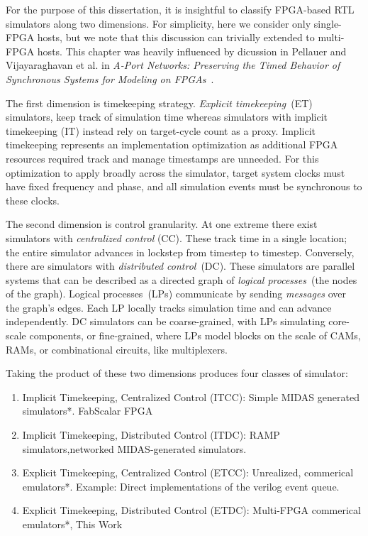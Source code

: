 
For the purpose of this dissertation, it is insightful to classify FPGA-based
RTL simulators along two dimensions. For simplicity, here we consider only
single-FPGA hosts, but we note that this discussion can trivially extended to
multi-FPGA hosts. This chapter was heavily influenced by dicussion in Pellauer
and Vijayaraghavan et al. in \emph{A-Port Networks: Preserving the Timed
Behavior of Synchronous Systems for Modeling on FPGAs}~\cite{APortNetwork}.

The first dimension is timekeeping strategy. \emph{Explicit timekeeping}~(ET)
simulators, keep track of simulation time whereas simulators with implicit
timekeeping (IT) instead rely on target-cycle count as a proxy. Implicit timekeeping represents an
implementation optimization as additional FPGA resources required track and
manage timestamps are unneeded. For this optimization to apply broadly across
the simulator, target system clocks must have fixed frequency and phase, and
all simulation events must be synchronous to these clocks.

The second dimension is control granularity. At one extreme there exist
simulators with \emph{centralized control} (CC). These track time in
a single location; the entire simulator advances in lockstep from
timestep to timestep.  Conversely, there are simulators with \emph{distributed
control}~(DC). These simulators are parallel systems that can be described as a directed graph of \emph{logical
processes}~(the nodes of the graph). Logical processes~(LPs) communicate by sending \emph{messages} over the graph's edges. 
Each LP locally tracks simulation time and can advance independently. DC
simulators can be coarse-grained, with LPs simulating core-scale components, or
fine-grained, where LPs model blocks on the scale of CAMs, RAMs, or
combinational circuits, like multiplexers.

Taking the product of these two dimensions produces four classes of simulator:

\begin{enumerate}
\item{Implicit Timekeeping, Centralized Control (ITCC)}: Simple MIDAS generated simulators*. FabScalar FPGA

\item{Implicit Timekeeping, Distributed Control (ITDC)}: RAMP simulators,networked MIDAS-generated simulators.

\item{Explicit Timekeeping, Centralized Control (ETCC)}: Unrealized, commerical emulators*. Example: Direct implementations of the verilog event queue.

\item{Explicit Timekeeping, Distributed Control (ETDC)}: Multi-FPGA commerical emulators*, This Work
\end{enumerate}

